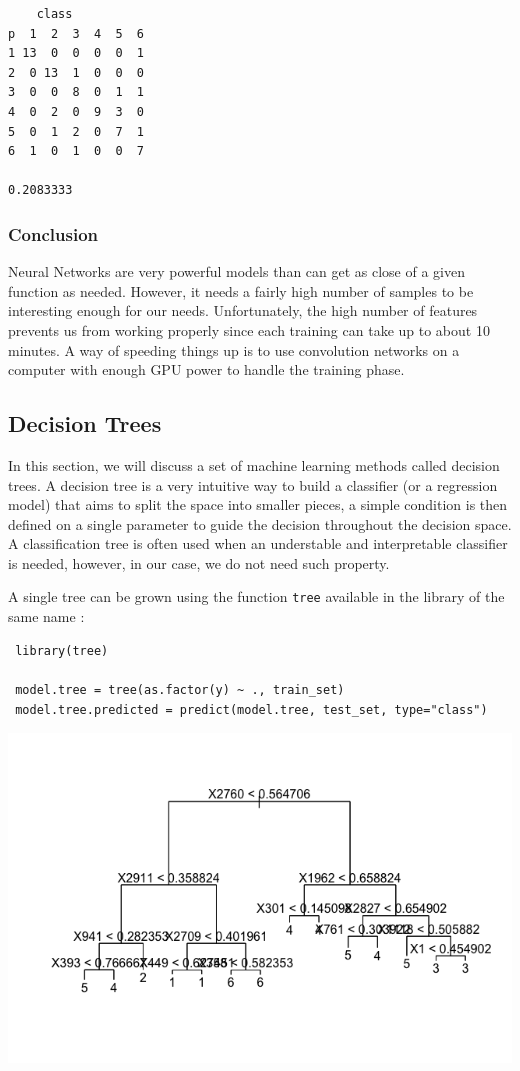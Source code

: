 \documentclass[]{report}
\begin{document}
\begin{verbatim}
    class
p  1  2  3  4  5  6
1 13  0  0  0  0  1
2  0 13  1  0  0  0
3  0  0  8  0  1  1
4  0  2  0  9  3  0
5  0  1  2  0  7  1
6  1  0  1  0  0  7

0.2083333
\end{verbatim}

\subsubsection{Conclusion}
Neural Networks are very powerful models than can get as close of a given function as needed. However, it needs a fairly high number of samples to be interesting enough for our needs. Unfortunately, the high number of features prevents us from working properly since each training can take up to about 10 minutes. A way of speeding things up is to use convolution networks on a computer with enough GPU power to handle the training phase.

\pagebreak

\subsection{Decision Trees}
 In this section, we will discuss a set of machine learning methods called decision trees. A decision tree is a very intuitive way to build a classifier (or a regression model) that aims to split the space into smaller pieces, a simple condition is then defined on a single parameter to guide the decision throughout the decision space. A classification tree is often used when an understable and interpretable classifier is needed, however, in our case, we do not need such property.
 
 A single tree can be grown using the function \texttt{tree} available in the library of the same name : 
 \begin{lstlisting}
 library(tree)
 
 model.tree = tree(as.factor(y) ~ ., train_set) 
 model.tree.predicted = predict(model.tree, test_set, type="class")
 \end{lstlisting}
 
  \begin{center}
 	\includegraphics[width=0.6\linewidth]{Figures/tree_full.png}
 	\label{fig:tree_full}
 \end{center}
\end{document}

